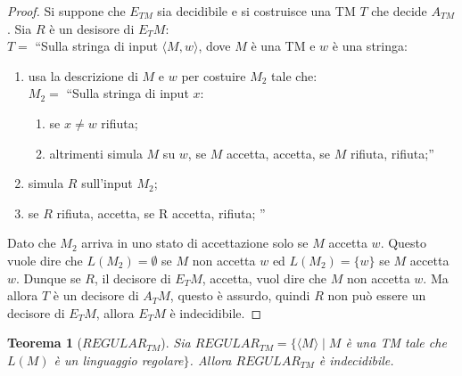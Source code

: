 \documentclass[11pt]{article}
\newtheorem{theorem}{Teorema}[section]
\newtheorem{proof}{Dimostrazione}[section]
\begin{document}
\begin{proof}
Si suppone che $E_{TM}$ sia decidibile e si costruisce una TM
$T$ che decide $A_{TM}$. Sia $R$ è un desisore di $E_TM$:\\
$T = $ ``Sulla stringa di input $\langle M, w \rangle$, dove $M$ è una TM e
$w$ è una stringa:
\begin{enumerate}
	\item usa la descrizione di $M$ e $w$ per costuire $M_2$ tale che:\\
		$M_2 = $ ``Sulla stringa di input $x$:
		\begin{enumerate}
			\item se $x \neq w$ rifiuta;
			\item altrimenti simula $M$ su $w$, se $M$ accetta, accetta, se $M$
				rifiuta, rifiuta;''
		\end{enumerate}

	\item simula $R$ sull'input $M_2$;
	\item se $R$ rifiuta, accetta, se R accetta, rifiuta; ''
\end{enumerate}

Dato che $M_2$ arriva in uno stato di accettazione solo se $M$ accetta $w$.
Questo vuole dire che $L(M_2) = \emptyset$ se $M$ non accetta $w$ ed $L(M_2) =
\{ w \}$ se $M$ accetta $w$. Dunque se $R$, il decisore di $E_TM$, accetta, vuol
dire che $M$ non accetta $w$. Ma allora $T$ è un decisore di $A_TM$, questo è
assurdo, quindi $R$ non può essere un decisore di $E_TM$, allora $E_TM$ è
indecidibile.
\end{proof}

\begin{theorem}[$REGULAR_{TM}$]
	Sia $REGULAR_{TM} = \{\langle M \rangle \mid M$ è una TM tale che 
	$L(M)$ è un linguaggio regolare$\}$. Allora $REGULAR_{TM}$ è
	indecidibile.
\end{theorem}
\end{document}
